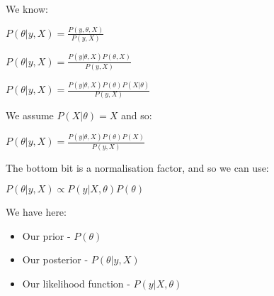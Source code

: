 We know:

\(P(\theta |y,X)=\frac{P(y, \theta, X )}{P(y, X)}\)

\(P(\theta |y,X)=\frac{P(y| \theta, X )P(\theta, X)}{P(y, X)}\)

\(P(\theta |y,X)=\frac{P(y| \theta, X )P(\theta )P(X|\theta )}{P(y, X)}\)

We assume \(P(X|\theta )=X\) and so:

\(P(\theta |y,X)=\frac{P(y| \theta, X )P(\theta )P(X)}{P(y, X)}\)

The bottom bit is a normalisation factor, and so we can use:

\(P(\theta |y,X)\propto P(y| X, \theta)P(\theta)\)

We have here:

\begin{itemize}
\item Our prior - \(P(\theta )\)
\item Our posterior - \(P(\theta |y,X)\)
\item Our likelihood function - \(P(y| X, \theta )\)
\end{itemize}

